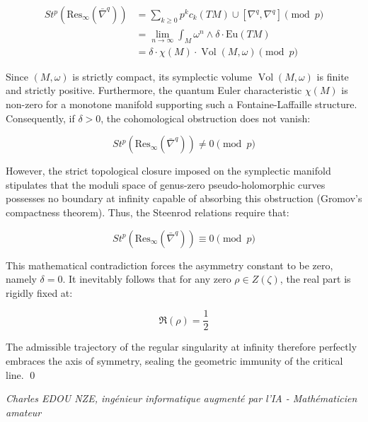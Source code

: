 \documentclass[
]{article}
\begin{document}
\begin{align*}
St^p \left( \text{Res}_\infty(\bar{\nabla}^q) \right) &= \sum_{k \geq 0} p^k c_k(TM) \cup \left[ \nabla^q, \nabla^q \right] \pmod p \\
&= \lim_{n \to \infty} \int_{M} \omega^n \wedge \delta \cdot \text{Eu}(TM) \\
&= \delta \cdot \chi(M) \cdot \operatorname{Vol}(M, \omega) \pmod p
\end{align*}

Since $(M, \omega)$ is strictly compact, its symplectic volume $\operatorname{Vol}(M, \omega)$ is finite and strictly positive. Furthermore, the quantum Euler characteristic $\chi(M)$ is non-zero for a monotone manifold supporting such a Fontaine-Laffaille structure. Consequently, if $\delta > 0$, the cohomological obstruction does not vanish:

\begin{equation*}
St^p \left( \text{Res}_\infty(\bar{\nabla}^q) \right) \neq 0 \pmod p
\end{equation*}

However, the strict topological closure imposed on the symplectic manifold stipulates that the moduli space of genus-zero pseudo-holomorphic curves possesses no boundary at infinity capable of absorbing this obstruction (Gromov's compactness theorem). Thus, the Steenrod relations require that:

\begin{equation*}
St^p \left( \text{Res}_\infty(\bar{\nabla}^q) \right) \equiv 0 \pmod p
\end{equation*}

This mathematical contradiction forces the asymmetry constant to be zero, namely $\delta = 0$. It inevitably follows that for any zero $\rho \in Z(\zeta)$, the real part is rigidly fixed at:

\begin{equation*}
\Re(\rho) = \frac{1}{2}
\end{equation*}

The admissible trajectory of the regular singularity at infinity therefore perfectly embraces the axis of symmetry, sealing the geometric immunity of the critical line. \qed

\vspace{1cm}
\begin{flushright}
\textit{Charles EDOU NZE, ingénieur informatique augmenté par l'IA - Mathématicien amateur}
\end{flushright}
\end{document}
